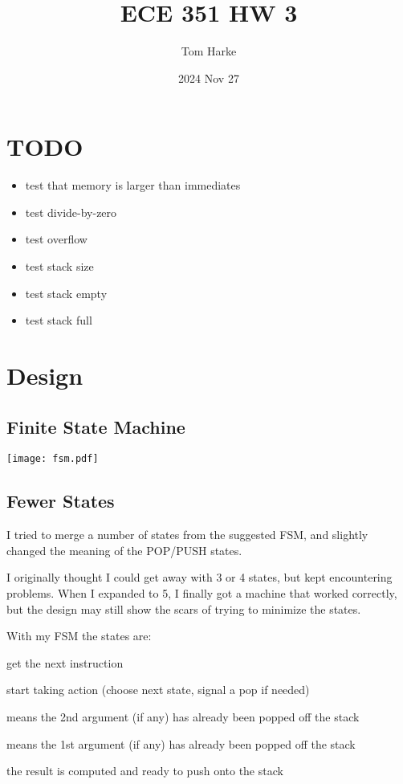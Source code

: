 \documentclass{article}
\title{ECE 351 HW 3}
\date{2024 Nov 27}
\author{Tom Harke}
\begin{document}
\maketitle


\section{TODO}
\begin{itemize}
\item test that memory is larger than immediates
\item test divide-by-zero
\item test overflow
\item test stack size
\item test stack empty
\item test stack full
\end{itemize}
\section{Design}
\subsection{Finite State Machine}
\texttt{[image: fsm.pdf]}
\subsection{Fewer States}
I tried to merge a number of states from the suggested FSM,
and slightly changed the meaning of the POP/PUSH states.

I originally thought I could get away with 3 or 4 states, but kept encountering problems.
When I expanded to 5,
I finally got a machine that worked correctly, but the design may still show the scars of trying to minimize the states.


With my FSM the states are:
\begin{description}[noitemsep]
\item[FETCH:]  get the next instruction
\item[DECODE:] start taking action (choose next state, signal a pop if needed)
\item[POP2:]   means the 2nd argument (if any) has already been popped off the stack
\item[POP1:]   means the 1st argument (if any) has already been popped off the stack
\item[PUSH:]   the result is computed and ready to push onto the stack
\end{description}
\end{document}
